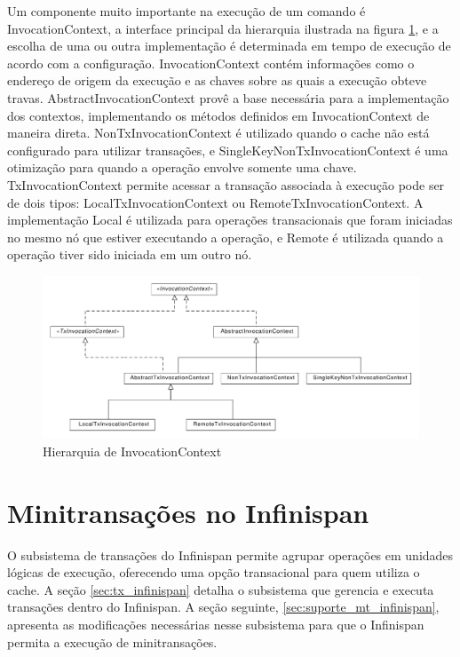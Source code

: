 \documentclass[11pt,twoside,a4paper]{book}
\begin{document}
Um componente muito importante na execução de um comando é InvocationContext, a interface principal da hierarquia ilustrada na figura \ref{fig:invocation_context}, e a escolha de uma ou outra implementação é determinada em tempo de execução de acordo com a configuração. InvocationContext contém informações como o endereço de origem da execução e as chaves sobre as quais a execução obteve travas. AbstractInvocationContext provê a base necessária para a implementação dos contextos, implementando os métodos definidos em InvocationContext de maneira direta. NonTxInvocationContext é utilizado quando o cache não está configurado para utilizar transações, e SingleKeyNonTxInvocationContext é uma otimização para quando a operação envolve somente uma chave. TxInvocationContext permite acessar a transação associada à execução pode ser de dois tipos: LocalTxInvocationContext ou RemoteTxInvocationContext. A implementação Local é utilizada para operações transacionais que foram iniciadas no mesmo nó que estiver executando a operação, e Remote é utilizada quando a operação tiver sido iniciada em um outro nó. 

\begin{figure}
  \centering
  \includegraphics[width=\textwidth]{invocation_context} 
  \caption{Hierarquia de InvocationContext}
  \label{fig:invocation_context} 
\end{figure}

\section{Minitransações no Infinispan}
\label{sec:mt_infinispan}
O subsistema de transações do Infinispan permite agrupar operações em unidades lógicas de execução, oferecendo uma opção transacional para quem utiliza o cache. A seção \ref{sec:tx_infinispan} detalha o subsistema que gerencia e executa transações dentro do Infinispan. A seção seguinte, \ref{sec:suporte_mt_infinispan}, apresenta as modificações necessárias nesse subsistema para que o Infinispan permita a execução de minitransações.
\end{document}

